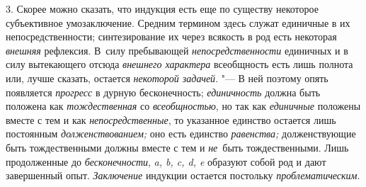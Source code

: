 3. Скорее можно сказать, что индукция есть еще по существу
некоторое субъективное умозаключение. Средним термином здесь служат
единичные в их непосредственности; синтезирование их через всякость в род
есть некоторая {\em внешняя}
рефлексия. В~силу пребывающей
{\em непосредственности}
единичных и в силу вытекающего отсюда
{\em внешнего характера}
всеобщность есть лишь полнота или, лучше
сказать, остается {\em некоторой
задачей}. "--- В ней поэтому опять появляется
{\em прогресс} в дурную
бесконечность; {\em единичность}
должна быть положена как
{\em тождественная} со
{\em всеобщностью}, но
так как {\em единичные}
положены вместе с тем и как
{\em непосредственные},
то указанное единство остается лишь постоянным
{\em долженствованием;}
оно есть единство
{\em равенства;}
долженствующие быть тождественными должны вместе с тем и
{\em не}~быть
тождественными. Лишь продолженные до
{\em бесконечности},
{\em a, b, c, d, e} образуют собой род и
дают завершенный опыт. {\em Заключение}
индукции остается постольку
{\em проблематическим}.

